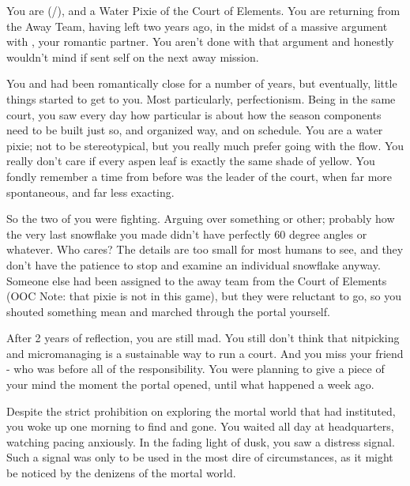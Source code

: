 \documentclass[char]{PP}
\begin{document}
\name{\cELove{}}

You are \cELove{} (\cELove{\They}/\cELove{\Them}), and a Water Pixie of the Court of Elements. You are returning from the Away Team, having left two years ago, in the midst of a massive argument with \cEHead{}, your romantic partner. You aren’t done with that argument and honestly wouldn’t mind if \cEHead{} sent \cEHead{\them}self on the next away mission.

You and \cEHead{} had been romantically close for a number of years, but eventually, little things started to get to you. Most particularly, \cEHead{\their} perfectionism. Being in the same court, you saw every day how particular \cEHead{} is about how the season components need to be built just so, and organized \cEHead{\their} way, and on \cEHead{\their} schedule. You are a water pixie; not to be stereotypical, but you really much prefer going with the flow. You really don’t care if every aspen leaf is exactly the same shade of yellow. You fondly remember a time from before \cEHead{} was the leader of the court, when \cEHead{\they} \cEHead{\were} far more spontaneous, and far less exacting.

So the two of you were fighting. Arguing over something or other; probably how the very last snowflake you made didn’t have perfectly 60 degree angles or whatever. Who cares? The details are too small for most humans to see, and they don’t have the patience to stop and examine an individual snowflake anyway. Someone else had been assigned to the away team from the Court of Elements (OOC Note: that pixie is not in this game), but they were reluctant to go, so you shouted something mean and marched through the portal yourself.

After 2 years of reflection, you are still mad. You still don’t think that nitpicking and micromanaging is a sustainable way to run a court. And you miss your friend - who \cEHead{} was before all of the responsibility. You were planning to give \cEHead{} a piece of your mind the moment the portal opened, until what happened a week ago.

Despite the strict prohibition on exploring the mortal world that \cSPM{} had instituted, you woke up one morning to find \cFLost{} and \cMChange{} gone. You waited all day at headquarters, watching \cSPM{} pacing anxiously. In the fading light of dusk, you saw a distress signal. Such a signal was only to be used in the most dire of circumstances, as it might be noticed by the denizens of the mortal world. 
\end{document}
